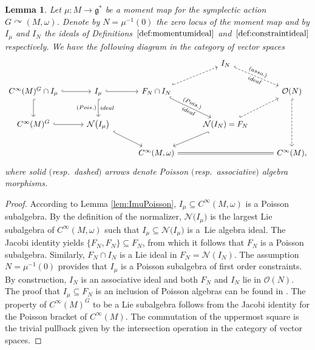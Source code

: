 \documentclass[10pt,a4paper]{amsart}
\numberwithin{equation}{section}
\newtheorem{Lemma}[Theorem]{Lemma}
\DeclareMathOperator{\action}{\curvearrowright}
\newcommand{\g}{\mathfrak{g}}
\renewcommand{\subset}{\subseteq}
\begin{document}
\begin{Lemma}\label{lem:ImuVSIN}
	Let $\mu\colon M\to\g^*$ be a moment map for the symplectic action $G\action (M,\omega)$. Denote by $N=\mu^{-1}(0)$ the zero locus of the moment map and by $I_\mu$ and $I_N$ the ideals of Definitions~$\ref{def:momentumideal}$ and~$\ref{def:constraintideal}$ respectively.
	We have the following diagram in the category of vector spaces
	\[
	\begin{tikzcd}[column sep = 2.8em]
		& & &
		I_N \ar[dr,hook,dashed,"(asso.)","ideal"',sloped]
		&
		\\
		C^\infty(M)^G\cap I_\mu \ar[r,hook] \ar[d,hook] &
		I_{\mu} \ar[r,hook] \ar[d,hook,"(Pois.)"',"ideal"]
		& F_N\cap I_N \ar[ur,sloped, hook, dashed] \ar[dr,sloped, hook,"(Pois.)","ideal"',sloped]
		& &
		\mathcal{O}(N) \ar[dd,hook,dashed]
		\\[.5em]
		C^\infty(M)^G \ar[r,hook] &
		\mathcal{N}\bigl(I_\mu\bigr) \ar[dr,hook,sloped]& &
		\mathcal{N}(I_N)=F_N \ar[ur,sloped,hook,dashed]\ar[dl,hook,sloped] &
		\\
		& &
		C^\infty(M,\omega) \ar[rr,equal]& &
		C^\infty(M),
	\end{tikzcd}	
	\]
	where solid $($resp.\ dashed$)$ arrows denote Poisson $($resp.\ associative$)$ algebra morphisms.
\end{Lemma}

\begin{proof}
	According to Lemma \ref{lem:ImuPoisson}, $I_\mu\subset C^\infty(M,\omega)$ is a Poisson subalgebra.
	By the definition of the normalizer, $\mathcal{N}\bigl(I_\mu\bigr)$ is the largest Lie subalgebra of $C^\infty(M,\omega)$ such that $I_\mu\subset\mathcal{N}\bigl(I_\mu\bigr)$ is a~Lie algebra ideal.
	The Jacobi identity yields $\{F_N,F_N\}\subset F_N$, from which it follows that $F_N$ is a Poisson subalgebra.
	Similarly, $F_N\cap I_N$ is a Lie ideal in $F_N= \mathcal{N}(I_N)$.
	The assumption $N=\mu^{-1}(0)$ provides that $I_\mu$ is a Poisson subalgebra of first order constraints.
	By construction, $I_{N}$ is an associative ideal and both $F_N$ and $I_N$ lie in $\mathcal{O}(N)$.
	The proof that $I_{\mu}\subset F_N$ is an inclusion of Poisson algebras can be found in \cite[Proposition~5.1]{ArmsGotayJennings90}.
	The property of $C^\infty(M)^G$ to be a Lie subalgebra follows from the Jacobi identity for the Poisson bracket of $C^\infty(M)$.
	The commutation of the uppermost square is the trivial pullback given by the intersection operation in the category of vector spaces.
\end{proof}
\end{document}
